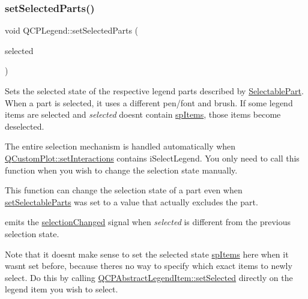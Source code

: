 \subsubsection{\texorpdfstring{set\+Selected\+Parts()}{setSelectedParts()}}
{\footnotesize\ttfamily void Q\+C\+P\+Legend\+::set\+Selected\+Parts (\begin{DoxyParamCaption}\item[{const Selectable\+Parts \&}]{selected }\end{DoxyParamCaption})}

Sets the selected state of the respective legend parts described by \hyperlink{class_q_c_p_legend_a5404de8bc1e4a994ca4ae69e2c7072f1}{Selectable\+Part}. When a part is selected, it uses a different pen/font and brush. If some legend items are selected and {\itshape selected} doesn\textquotesingle{}t contain \hyperlink{class_q_c_p_legend_a5404de8bc1e4a994ca4ae69e2c7072f1a768bfb95f323db4c66473375032c0af7}{sp\+Items}, those items become deselected.

The entire selection mechanism is handled automatically when \hyperlink{class_q_custom_plot_a5ee1e2f6ae27419deca53e75907c27e5}{Q\+Custom\+Plot\+::set\+Interactions} contains i\+Select\+Legend. You only need to call this function when you wish to change the selection state manually.

This function can change the selection state of a part even when \hyperlink{class_q_c_p_legend_a9ce60aa8bbd89f62ae4fa83ac6c60110}{set\+Selectable\+Parts} was set to a value that actually excludes the part.

emits the \hyperlink{class_q_c_p_legend_a82c88464edac07a9eefaf3906268df3b}{selection\+Changed} signal when {\itshape selected} is different from the previous selection state.

Note that it doesn\textquotesingle{}t make sense to set the selected state \hyperlink{class_q_c_p_legend_a5404de8bc1e4a994ca4ae69e2c7072f1a768bfb95f323db4c66473375032c0af7}{sp\+Items} here when it wasn\textquotesingle{}t set before, because there\textquotesingle{}s no way to specify which exact items to newly select. Do this by calling \hyperlink{class_q_c_p_abstract_legend_item_a6eed93b0ab99cb3eabb043fb08179c2b}{Q\+C\+P\+Abstract\+Legend\+Item\+::set\+Selected} directly on the legend item you wish to select.

